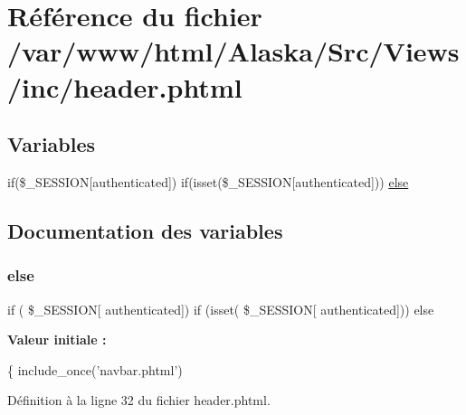 \hypertarget{header_8phtml}{}\section{Référence du fichier /var/www/html/\+Alaska/\+Src/\+Views/inc/header.phtml}
\label{header_8phtml}
\subsection*{Variables}
\begin{DoxyCompactItemize}
\item 
if(\$\+\_\+\+S\+E\+S\+S\+I\+ON\mbox{[}\textquotesingle{}authenticated\textquotesingle{}\mbox{]}) if(isset(\$\+\_\+\+S\+E\+S\+S\+I\+ON\mbox{[}\textquotesingle{}authenticated\textquotesingle{}\mbox{]})) \hyperlink{header_8phtml_a1dcfa257dd0f03188ac481d49546ca80}{else}
\end{DoxyCompactItemize}


\subsection{Documentation des variables}
\mbox{\label{header_8phtml_a1dcfa257dd0f03188ac481d49546ca80}} 
\subsubsection{\texorpdfstring{else}{else}}
{\footnotesize\ttfamily if ( \$\+\_\+\+S\+E\+S\+S\+I\+ON\mbox{[} \textquotesingle{}authenticated\textquotesingle{}\mbox{]}) if (isset( \$\+\_\+\+S\+E\+S\+S\+I\+ON\mbox{[} \textquotesingle{}authenticated\textquotesingle{}\mbox{]})) else}

{\bfseries Valeur initiale \+:}
\begin{DoxyCode}
\{
      include\_once(\textcolor{stringliteral}{'navbar.phtml'})
\end{DoxyCode}


Définition à la ligne 32 du fichier header.\+phtml.

